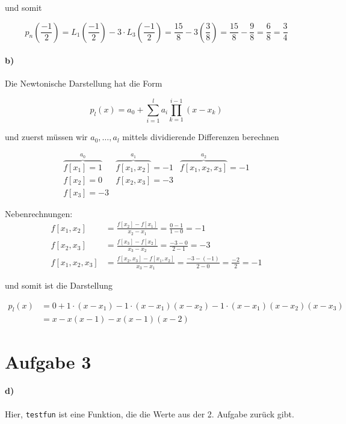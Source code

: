 \documentclass[a4paper,ngerman]{scrartcl}
\begin{document}
und somit

\[
p_n\left(\frac{-1}{2}\right) = L_1\left(\frac{-1}{2}\right) - 3 \cdot
L_3\left(\frac{-1}{2}\right) = \frac{15}{8} -
3\left(\frac{3}{8}\right) = \frac{15}{8} - \frac{9}{8} = \frac{6}{8} =
\frac{3}{4}
\]

\paragraph{b)}
Die Newtonische Darstellung hat die Form

\[
p_l(x) = a_0 + \sum^l_{i = 1} a_i \prod^{i-1}_{k = 1} (x-x_k)
\]

und zuerst müssen wir $a_0,\dots,a_l$ mittels dividierende Differenzen
berechnen

\[
\begin{array}{lll}
  \overbrace{f[x_1] = 1}^{a_0} & \overbrace{f[x_1,x_2]}^{a_1} = -1 & \overbrace{f[x_1,x_2,x_3]}^{a_2} = -1\\
  f[x_2] = 0 & f[x_2,x_3] = -3\\
  f[x_3] = -3
\end{array}
\]

Nebenrechnungen:
\begin{align*}
  f[x_1,x_2] &= \frac{f[x_2] - f[x_1]}{x_2 - x_1} = \frac{0 - 1}{1 - 0} = -1\\
  f[x_2,x_3] &= \frac{f[x_3] - f[x_2]}{x_3 - x_2} = \frac{-3 - 0}{2 - 1} = -3\\
  f[x_1,x_2,x_3] &= \frac{f[x_2,x_3] - f[x_1,x_2]}{x_3 - x_1} =
  \frac{-3 - (-1)}{2 - 0} = \frac{-2}{2} = -1
\end{align*}

und somit ist die Darstellung

\begin{align*}
  p_l(x) &= 0 + 1\cdot (x-x_1) - 1 \cdot (x-x_1) (x-x_2) -1\cdot (x-x_1)(x-x_2)(x-x_3)\\
  &= x - x(x-1) - x(x-1)(x-2)
\end{align*}

\section*{Aufgabe 3}

\paragraph{d)}

Hier, \texttt{testfun} ist eine Funktion, die die Werte aus der
2. Aufgabe zurück gibt.


\end{document}
